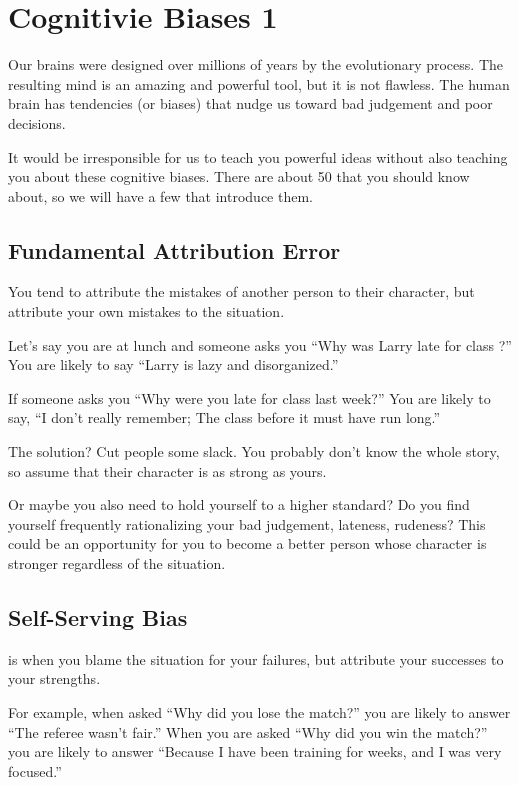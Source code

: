 \chapter{Cognitivie Biases 1}


Our brains were designed over millions of years by the evolutionary
process. The resulting mind is an amazing and powerful tool, but it is
not flawless. The human brain has tendencies (or biases) that nudge us
toward bad judgement and poor decisions.

It would be irresponsible for us to teach you powerful ideas without
also teaching you about these cognitive biases. There are about 50
that you should know about, so we will have a few that introduce them.

\section{Fundamental Attribution Error}

You tend to attribute
the mistakes of another person to their character, but attribute your
own mistakes to the situation.

Let's say you are at lunch and someone asks you ``Why was Larry late
for class ?''  You are likely to say ``Larry is lazy
and disorganized.''

If someone asks you ``Why were you late for class last week?''  You
are likely to say, ``I don't really remember; The class before it must have
run long.''

The solution? Cut people some slack. You probably don't know the whole
story, so assume that their character is as strong as yours.

Or maybe you also need to hold yourself to a higher standard? Do you find
yourself frequently rationalizing your bad judgement, lateness,
rudeness?  This could be an opportunity for you to become a better
person whose character is stronger regardless of the situation.

\section{Self-Serving Bias}

 is when you blame the situation for your
failures, but attribute your successes to your strengths.

For example, when asked ``Why did you lose the match?'' you are likely
to answer ``The referee wasn't fair.''  When you are asked ``Why did
you win the match?'' you are likely to answer ``Because I have been
training for weeks, and I was very focused.''

